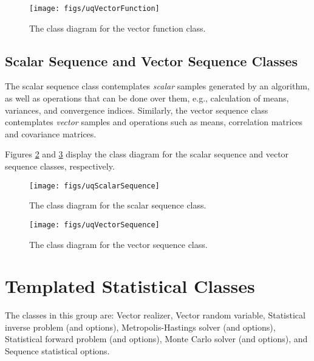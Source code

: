 \begin{figure}[h!]
\centering
\texttt{[image: figs/uqVectorFunction]}
\vspace{-8pt}
\caption{The class diagram for the vector function class.}
\label{fig-vector-function-class}
\end{figure}


\subsection{Scalar Sequence and Vector Sequence Classes}\label{sec:scalar-vector-sequence}
%
The scalar sequence class contemplates {\it scalar} samples generated by an algorithm, as well as operations that can
be done over them, e.g., calculation of means, variances, and convergence indices.
Similarly, the vector sequence class contemplates {\it vector} samples and operations such as means, correlation matrices and covariance matrices.

Figures \ref{fig-scalar-sequence-class} and \ref{fig-vector-sequence-class} display the class diagram for the scalar sequence  and vector sequence classes, respectively.

\begin{figure}[h!]
\centering
\texttt{[image: figs/uqScalarSequence]}
\vspace{-8pt}
\caption{The class diagram for the scalar sequence class.}
\label{fig-scalar-sequence-class}
\end{figure}

\begin{figure}[h!]
\centering
\texttt{[image: figs/uqVectorSequence]}
\vspace{-8pt}
\caption{The class diagram for the vector sequence class.}
\label{fig-vector-sequence-class}
\end{figure}



\section{Templated Statistical Classes}

The classes in this group are: Vector realizer, Vector random variable, Statistical inverse problem (and options), Metropolis-Hastings solver (and options), Statistical forward problem (and options), Monte Carlo solver (and options), and Sequence statistical options.

